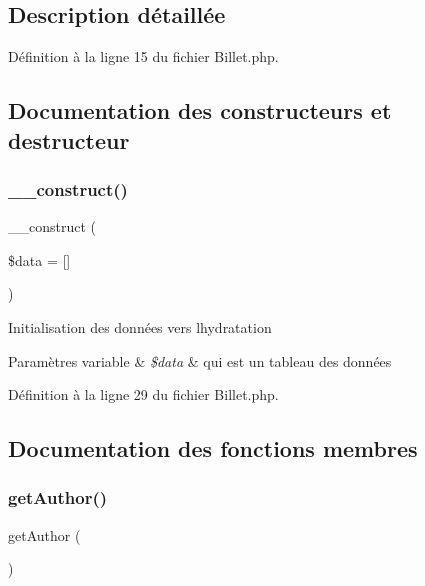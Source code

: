 \subsection{Description détaillée}


Définition à la ligne 15 du fichier Billet.\+php.



\subsection{Documentation des constructeurs et destructeur}
\mbox{\label{class_src_1_1_entity_1_1_billet_ab3129f1d71e9f51353de9d551ea381d7}} 
\subsubsection{\texorpdfstring{\+\_\+\+\_\+construct()}{\_\_construct()}}
{\footnotesize\ttfamily \+\_\+\+\_\+construct (\begin{DoxyParamCaption}\item[{}]{\$data = {\ttfamily \mbox{[}\mbox{]}} }\end{DoxyParamCaption})}

Initialisation des données vers l\textquotesingle{}hydratation 
\begin{DoxyParams}[1]{Paramètres}
variable & {\em \$data} & qui est un tableau des données \\
\hline
\end{DoxyParams}


Définition à la ligne 29 du fichier Billet.\+php.



\subsection{Documentation des fonctions membres}
\mbox{\label{class_src_1_1_entity_1_1_billet_a5286e30390ae3e1b274940286493dd24}} 
\subsubsection{\texorpdfstring{get\+Author()}{getAuthor()}}
{\footnotesize\ttfamily get\+Author (\begin{DoxyParamCaption}{ }\end{DoxyParamCaption})}



